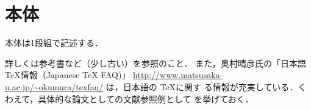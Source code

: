 \section{本体}

本体は1段組で記述する．

詳しくは参考書など（少し古い）\cite{野寺隆志1990楽々}\cite{磯崎秀樹1992latex}を参照のこと．
また，奥村晴彦氏の「日本語\TeX 情報（Japanese TeX FAQ)」
\url{http://www.matsusaka-u.ac.jp/~okumura/texfaq/} は，日本語の \TeX に関す
る情報が充実している．くわえて，具体的な論文としての文献参照例として
\cite{bryant1986graph}を挙げておく．
